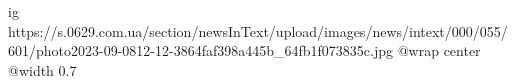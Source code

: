  
 
 
 
 

\ifcmt
  ig https://s.0629.com.ua/section/newsInText/upload/images/news/intext/000/055/601/photo2023-09-0812-12-3864faf398a445b_64fb1f073835c.jpg
  @wrap center
  @width 0.7
\fi
